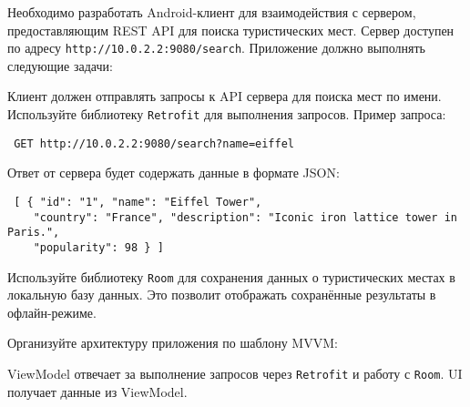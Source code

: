 
Необходимо разработать Android-клиент для взаимодействия с сервером, предоставляющим REST API для поиска туристических мест. Сервер доступен по адресу \texttt{http://10.0.2.2:9080/search}. Приложение должно выполнять следующие задачи:


Клиент должен отправлять запросы к API сервера для поиска мест по имени. Используйте библиотеку \texttt{Retrofit} для выполнения запросов. Пример запроса:

\begin{verbatim} GET http://10.0.2.2:9080/search?name=eiffel \end{verbatim}

Ответ от сервера будет содержать данные в формате JSON:

\begin{verbatim} [ { "id": "1", "name": "Eiffel Tower", 
    "country": "France", "description": "Iconic iron lattice tower in Paris.", 
    "popularity": 98 } ] \end{verbatim}


Используйте библиотеку \texttt{Room} для сохранения данных о туристических местах в локальную базу данных. Это позволит отображать сохранённые результаты в офлайн-режиме.


Организуйте архитектуру приложения по шаблону MVVM:

ViewModel отвечает за выполнение запросов через \texttt{Retrofit} и работу с \texttt{Room}.
UI получает данные из ViewModel.

